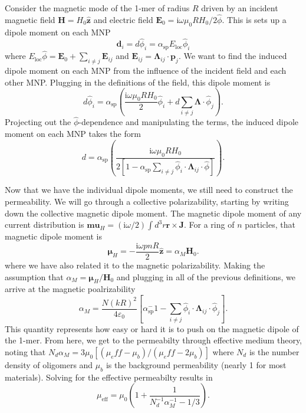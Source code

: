 \documentclass [11pt, proquest] {uwthesis}[2016/11/22]
\begin{document}
Consider the magnetic mode of the 1-mer of radius $R$ driven by an incident magnetic field $\textbf{H} = H_0\hat{\textbf{z}}$ and electric field $\textbf{E}_0 = \textrm{i}\omega\mu_0RH_0/2\hat{\phi}$. This is sets up a dipole moment on each MNP
\begin{equation}
\textbf{d}_i = d\hat{\phi}_i = \alpha_{\textrm{sp}}E_{\textrm{loc}}\hat{\phi}_i
\label{dipole_moment_1}
\end{equation}
where $E_{\textrm{loc}}\hat{\phi} = \textbf{E}_0 + \sum_{i\neq j}\textbf{E}_{ij}$ and $\textbf{E}_{ij} = \boldsymbol{\Lambda}_{ij}\cdot\textbf{p}_j$. We want to find the induced dipole moment on each MNP from the influence of the incident field and each other MNP. Plugging in the definitions of the field, this dipole moment is
\begin{equation}
d\hat{\phi}_i = \alpha_{\textrm{sp}}\left(\frac{\textrm{i}\omega\mu_0RH_0}{2}\hat{\phi}_i + d\sum_{i\neq j}\boldsymbol{\Lambda}\cdot\hat{\phi}_j\right).
\label{dipole_moment_2}
\end{equation}
Projecting out the $\hat{\phi}$-dependence and manipulating the terms, the induced dipole moment on each MNP takes the form
\begin{equation}
d = \alpha_{\textrm{sp}}\left(\frac{\textrm{i}\omega\mu_0RH_0}{2\left[1 - \alpha_{\textrm{sp}}\sum_{i\neq j}\hat{\phi}_i\cdot\boldsymbol{\Lambda}_{ij}\cdot\hat{\phi}\right]}\right).
\label{dipole_moment_3}
\end{equation}

Now that we have the individual dipole moments, we still need to construct the permeability. We will go through a collective polarizability, starting by writing down the collective magnetic dipole moment. The magnetic dipole moment of any current distribution is $\boldsymbol{mu}_H = (\textrm{i}\omega/2)\int d^3r\textbf{r}\times\textbf{J}$. For a ring of $n$ particles, that magnetic dipole moment is
\begin{equation}
\boldsymbol{\mu}_H = -\frac{\textrm{i}\omega pnR}{2}\hat{\textbf{z}} = \alpha_{M}\textbf{H}_0.
\label{mag_dip_1}
\end{equation}
where we have also related it to the magnetic polarizability. Making the assumption that $\alpha_M = \boldsymbol{\mu}_H/\textbf{H}_0$ and plugging in all of the previous definitions, we arrive at the magnetic poalrizability
\begin{equation}
\alpha_M = \frac{N(kR)^2}{4\varepsilon_0}\left[\alpha_{\textrm{sp}}^-1 - \sum_{i\neq j} \hat{\phi}_i\cdot\boldsymbol{\Lambda}_{ij}\cdot\hat{\phi}_j\right].
\label{alpha_mag}
\end{equation}
This quantity represents how easy or hard it is to push on the magnetic dipole of the 1-mer. From here, we get to the permeabilty through effective medium theory, noting that $N_d\alpha_M = 3\mu_0[(\mu_eff-\mu_b)/(\mu_eff-2\mu_b)]$ where $N_d$ is the number density of oligomers and $\mu_b$ is the background permeability (nearly 1 for most materials). Solving for the effective permeabilty results in
\begin{equation}
\mu_{\textrm{eff}} = \mu_0\left(1+\frac{1}{N_d^{-1}\alpha_M^{-1}-1/3}\right).
\label{mu_eff}
\end{equation}
\end{document}
